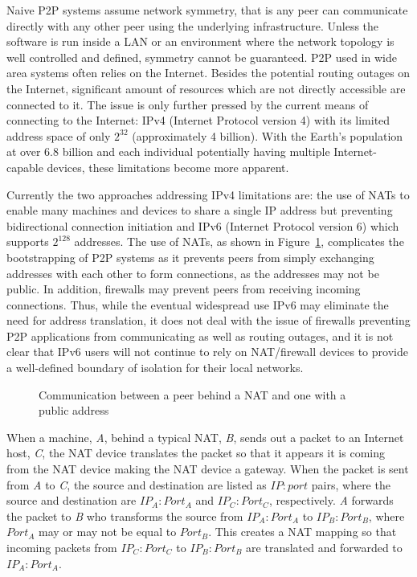 Naive P2P systems assume network symmetry, that is any peer can communicate
directly with any other peer using the underlying infrastructure.  Unless the
software is run inside a LAN or an environment where the network topology is
well controlled and defined, symmetry cannot be guaranteed.  P2P used in wide
area systems often relies on the Internet.  Besides the potential routing
outages on the Internet, significant amount of resources which are not directly
accessible are connected to it.  The issue is only further pressed by the
current means of connecting to the Internet: IPv4 (Internet Protocol version 4)
with its limited address space of only $2^{32}$ (approximately 4 billion).
With the Earth's population at over 6.8 billion and each individual potentially
having multiple Internet-capable devices, these limitations become more
apparent.

Currently the two approaches addressing IPv4 limitations are:  the use of NATs
to enable many machines and devices to share a single IP address but preventing
bidirectional connection initiation and IPv6 (Internet Protocol version 6)
which supports $2^{128}$ addresses.  The use of NATs, as shown in
Figure~\ref{fig:nat}, complicates the bootstrapping of P2P systems as it
prevents peers from simply exchanging addresses with each other to form
connections, as the addresses may not be public.  In addition, firewalls may
prevent peers from receiving incoming connections.  Thus, while the eventual
widespread use IPv6 may eliminate the need for address translation, it does not
deal with the issue of firewalls preventing P2P applications from communicating
as well as routing outages, and it is not clear that IPv6 users will not
continue to rely on NAT/firewall devices to provide a well-defined boundary of
isolation for their local networks.

\begin{figure}
\centering
{}
\caption{Communication between a peer behind a NAT and one with a public address}
\label{fig:nat}
\end{figure}

When a machine, \textit{A}, behind a typical NAT, \textit{B}, sends out a
packet to an Internet host, \textit{C}, the NAT device translates the packet so
that it appears it is coming from the NAT device making the NAT device a
gateway.  When the packet is sent from \textit{A} to \textit{C}, the source and
destination are listed as $IP:port$ pairs, where the source and destination are
$IP_A:Port_A$ and $IP_C:Port_C$, respectively.  \textit{A} forwards the packet
to \textit{B} who transforms the source from $IP_A:Port_A$ to $IP_B:Port_B$,
where $Port_A$ may or may not be equal to $Port_B$.  This creates a NAT mapping
so that incoming packets from $IP_C:Port_C$ to $IP_B:Port_B$ are translated and
forwarded to $IP_A:Port_A$.

